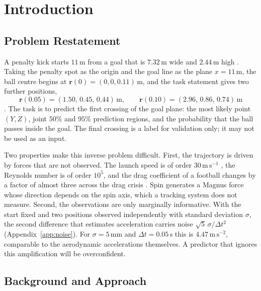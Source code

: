 \documentclass[11pt,a4paper]{article}
\begin{document}
\clearpage
\tableofcontents
\clearpage

\section{Introduction}
\subsection{Problem Restatement}

A penalty kick starts $11\,\mathrm{m}$ from a goal that is $7.32\,\mathrm{m}$ wide and $2.44\,\mathrm{m}$ high \cite{ifab}. Taking the penalty spot as the origin and the goal line as the plane $x=11\,\mathrm{m}$, the ball centre begins at $\mathbf{r}(0)=(0,0,0.11)\,\mathrm{m}$, and the task statement gives two further positions,
\begin{equation}
  \mathbf{r}(0.05)=(1.50,\,0.45,\,0.44)\,\mathrm{m},
  \qquad
  \mathbf{r}(0.10)=(2.96,\,0.86,\,0.74)\,\mathrm{m}
  \label{eq:given}
\end{equation}
\cite{upc2026}. The task is to predict the first crossing of the goal plane: the most likely point $(Y,Z)$, joint $50\%$ and $95\%$ prediction regions, and the probability that the ball passes inside the goal. The final crossing is a label for validation only; it may not be used as an input.

Two properties make this inverse problem difficult. First, the trajectory is driven by forces that are not observed. The launch speed is of order $30\,\mathrm{m\,s^{-1}}$ \cite{bray2003}, the Reynolds number is of order $10^5$, and the drag coefficient of a football changes by a factor of almost three across the drag crisis \cite{asai2007}. Spin generates a Magnus force whose direction depends on the spin axis, which a tracking system does not measure. Second, the observations are only marginally informative. With the start fixed and two positions observed independently with standard deviation $\sigma$, the second difference that estimates acceleration carries noise $\sqrt{5}\,\sigma/\Delta t^2$ (Appendix~\ref{app:noise}). For $\sigma=5\,\mathrm{mm}$ and $\Delta t=0.05\,\mathrm{s}$ this is $4.47\,\mathrm{m\,s^{-2}}$, comparable to the aerodynamic accelerations themselves. A predictor that ignores this amplification will be overconfident.

\subsection{Background and Approach}
\end{document}
